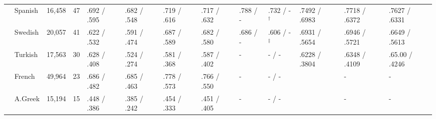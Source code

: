 \begin{landscape}
\begin{table}[ht]
\begin{tabular}{|l|l|l|l|p{1.5cm}|p{1.5cm}|p{1.5cm}|p{1.5cm}|p{1.5cm}|p{2cm}|p{2cm}|p{2cm}|p{2cm}|}
        & Spanish    & 16,458  & 47   & .692 / .595   & .682 / .548   & .719 / .616   & .717 / .632   & .788 / -   & .732 / -$^\dagger$& .7492 / .6983  & .7718 / .6372     & .7627 / .6331 \\
        & Swedish    & 20,057  & 41   & .622 / .532   & .591 / .474   & .687 / .589   & .682 / .580   & .686 / -   & .606 / -$^\ddagger$& .6931 / .5654  & .6946 / .5721     & .6649 / .5613 \\
        & Turkish    & 17,563  & 30   & .628 / .408   & .524 / .274   & .581 / .368   & .587 / .402   & -          & - / -& .6228 / .3804  & .6348 / .4109    & .65.00 / .4246 \\ \hline %
        & French     & 49,964  & 23   & .686 / .482   & .685 / .463   & .778 / .573   & .766 / .550   & -          & - / -& & -               & -        \\
        & A.Greek    & 15,194  & 15   & .448 / .386   & .385 / .242   & .454 / .333  & .451 / .405    & -          & - / -& & -               & -        \\ \hline
    \end{tabular}
\end{table}
\end{landscape}
